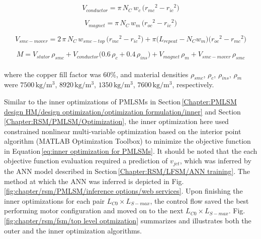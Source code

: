                 
                \begin{equation}
                    V_{conductor} = \pi\,N_C\,w_c\,\big( {r_{mc}}^2-{r_{ic}}^2 \big)
                    \label{eq:rsm/LFSM/V_conductor}
                \end{equation}
                
                
                \begin{equation}
                    V_{magnet} = \pi\,N_C\,w_m\,\big( {r_{oc}}^2-{r_{ic}}^2 \big)
                    \label{eq:rsm/LFSM/V_magnet}
                \end{equation}
                
                
                \begin{equation}
                    V_{smc-mover} = 2\,\pi\,N_C\,w_{smc-top}\,\big( {r_{mc}}^2-{r_{ic}}^2 \big) + \pi \big( L_{repeat}-N_C w_m \big) \big( {r_{oc}}^2-{r_{mc}}^2 \big) 
                    \label{eq:rsm/LFSM/V_smc_mover}
                \end{equation}
                
                
                \begin{equation}
                    M= V_{stator}\,\rho_{smc} + V_{conductor} \big(0.6\,\rho_c + 0.4\,\rho_{ins} \big) + V_{magnet}\,\rho_{m} + V_{smc-mover}\,\rho_{smc}
                    \label{eq:rsm/LFSM/M}
                \end{equation} \\
                
                
                where the copper fill factor was $60\%$, and material densities $\rho_{smc}$, $\rho_c$, $\rho_{ins}$, $\rho_{m}$ were $7500\,\mathrm{kg/m^3}$, $8920\,\mathrm{kg/m^3}$, $1350\,\mathrm{kg/m^3}$, $7600\,\mathrm{kg/m^3}$, respectively. 
                
                
                Similar to the inner optimizations of \acsp{PMLSM} in Section\,\ref{Chapter:PMLSM design HM/design optimization/optimization formulation/inner} and Section\,\ref{Chapter:RSM/PMLSM/Optimization}, the inner optimization here used constrained nonlinear multi-variable optimization based on the interior point algorithm (MATLAB Optimization Toolbox) to minimize the objective function in Equation\,\ref{eq:inner optimization for PMLSMs}. It should be noted that the each objective function evaluation required a prediction of $v_{jet}$, which was inferred by the \acs{ANN} model described in Section\,\ref{Chapter:RSM/LFSM/ANN training}. The method at which the \acs{ANN} was inferred is depicted in Fig.\,\ref{fig:chapter/rsm/PMLSM/inference options/web services}. Upon finishing the inner optimizations for each pair $L_{C0} \times L_{S-max}$, the control flow saved the best performing motor configuration and moved on to the next $L_{C0} \times L_{S-max}$. Fig.\,\ref{fig:chapter/rsm/fsm/top level optmization} summarizes and illustrates both the outer and the inner optimization algorithms.
                
